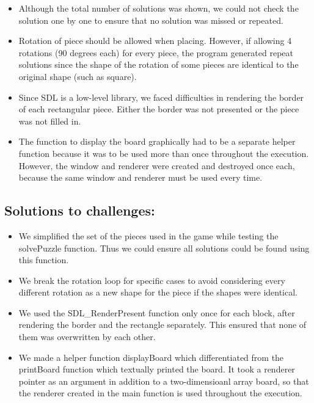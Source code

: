 \documentclass{article}
\begin{document}
\begin{itemize}
    \item Although the total number of solutions was shown, we could not check the solution one by one to ensure that no solution was missed or repeated.
    \item Rotation of piece should be allowed when placing. However, if allowing 4 rotations (90 degrees each) for every piece, the program generated repeat solutions since the shape of the rotation of some pieces are identical to the original shape (such as square).
    \item Since SDL is a low-level library, we faced difficulties in rendering the border of each rectangular piece. Either the border was not presented or the piece was not filled in. 
    \item The function to display the board graphically had to be a separate helper function because it was to be used more than once throughout the execution. However, the window and renderer were created and destroyed once each, because the same window and renderer must be used every time. 
\end{itemize}

\subsection{Solutions to challenges:}

\begin{itemize}
    \item We simplified the set of the pieces used in the game while testing the solvePuzzle function. Thus we could ensure all solutions could be found using this function.
    \item We break the rotation loop for specific cases to avoid considering every different rotation as a new shape for the piece if the shapes were identical.
    \item We used the SDL\_RenderPresent function only once for each block, after rendering the border and the rectangle separately. This ensured that none of them was overwritten by each other. 
    \item We made a helper function displayBoard which differentiated from the printBoard function which textually printed the board. It took a renderer pointer as an argument in addition to a two-dimensioanl array board, so that the renderer created in the main function is used throughout the execution.  
\end{itemize}
\end{document}
